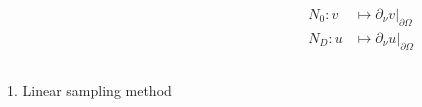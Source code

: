 \documentclass[10pt,xcolor={dvipsnames}]{beamer}
\theoremstyle{plain}
\theoremstyle{plain}
\begin{document}
\begin{frame}[t]
{\begin{columns}
\begin{column}{0.5\textwidth}
   \end{column}
   \begin{column}{0.5\textwidth}
   \vspace{0.6cm}
  \[
\begin{aligned}
 N_0: %
 v&\mapsto \partial_\nu v|_{\partial\Omega}\\
 N_D: %
 u&\mapsto \partial_\nu u|_{\partial\Omega}
\end{aligned}
\]
  \end{column}
  \end{columns}
}
\end{frame}
\begin{frame}[noframenumbering]
\begin{center}
\Large
 {\color{purple}1. Linear sampling method}
\end{center}
\end{frame}
\end{document}
